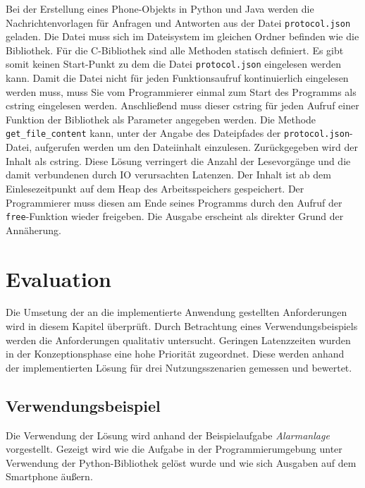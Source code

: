 \documentclass[11pt,a4paper]{report}
\begin{document}
Bei der Erstellung eines Phone-Objekts in Python und Java werden die Nachrichtenvorlagen für Anfragen und Antworten aus der Datei \texttt{protocol.json} geladen.
Die Datei muss sich im Dateisystem im gleichen Ordner befinden wie die Bibliothek.
Für die C-Bibliothek sind alle Methoden statisch definiert.
Es gibt somit keinen Start-Punkt zu dem die Datei \texttt{protocol.json} eingelesen werden kann.
Damit die Datei nicht für jeden Funktionsaufruf kontinuierlich eingelesen werden muss, muss Sie vom Programmierer einmal zum Start des Programms als cstring eingelesen werden.
Anschließend muss dieser cstring für jeden Aufruf einer Funktion der Bibliothek als Parameter angegeben werden.
Die Methode \texttt{get\_file\_content} kann, unter der Angabe des Dateipfades der \texttt{protocol.json}-Datei, aufgerufen werden um den Dateiinhalt einzulesen.
Zurückgegeben wird der Inhalt als cstring.
Diese Lösung verringert die Anzahl der Lesevorgänge und die damit verbundenen durch IO verursachten Latenzen.
Der Inhalt ist ab dem Einlesezeitpunkt auf dem Heap des Arbeitsspeichers gespeichert.
Der Programmierer muss diesen am Ende seines Programms durch den Aufruf der \texttt{free}-Funktion wieder freigeben.
Die Ausgabe erscheint als direkter Grund der Annäherung.


\chapter{Evaluation}\label{chap:eval}
Die Umsetung der an die implementierte Anwendung gestellten Anforderungen wird in diesem Kapitel überprüft.
Durch Betrachtung eines Verwendungsbeispiels werden die Anforderungen qualitativ untersucht.
Geringen Latenzzeiten wurden in der Konzeptionsphase eine hohe Priorität zugeordnet.
Diese werden anhand der implementierten Lösung für drei Nutzungsszenarien gemessen und bewertet.


\section{Verwendungsbeispiel}
Die Verwendung der Lösung wird anhand der Beispielaufgabe \textit{Alarmanlage} vorgestellt.
Gezeigt wird wie die Aufgabe in der Programmierumgebung unter Verwendung der Python-Bibliothek gelöst wurde und wie sich Ausgaben auf dem Smartphone äußern.
\end{document}
